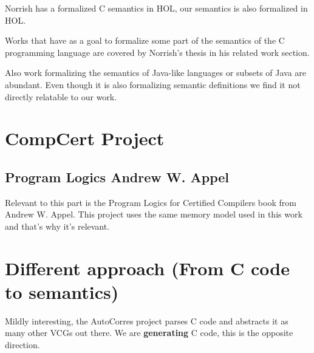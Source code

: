 Norrish has a formalized C semantics in HOL, our semantics is also formalized in HOL.

Works that have as a goal to formalize some part of the semantics of the C programming language are covered by Norrish's thesis in his related work section.

Also work formalizing the semantics of Java-like languages or subsets of Java are abundant.
Even though it is also formalizing semantic definitions we find it not directly relatable to our work.

\section{CompCert Project}

\subsection{Program Logics Andrew W. Appel}

Relevant to this part is the Program Logics for Certified Compilers book from Andrew W. Appel.
This project uses the same memory model used in this work and that's why it's relevant.

\section{Different approach (From C code to semantics)}

Mildly interesting, the AutoCorres project parses C code and abstracts it as many other VCGs out there.
We are \textbf{generating} C code, this is the opposite direction.
